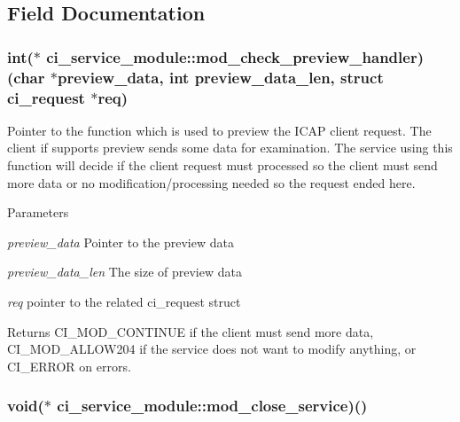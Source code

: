 \subsection{Field Documentation}
\hypertarget{structci__service__module_a2a50b9701b4d11e996167c7c992256da}{
\subsubsection[{mod\_\-check\_\-preview\_\-handler}]{\setlength{\rightskip}{0pt plus 5cm}int($\ast$ {\bf ci\_\-service\_\-module::mod\_\-check\_\-preview\_\-handler})(char $\ast$preview\_\-data, int preview\_\-data\_\-len, struct ci\_\-request $\ast$req)}}
\label{structci__service__module_a2a50b9701b4d11e996167c7c992256da}


Pointer to the function which is used to preview the ICAP client request. The client if supports preview sends some data for examination. The service using this function will decide if the client request must processed so the client must send more data or no modification/processing needed so the request ended here. 
\begin{DoxyParams}{Parameters}
\item[{\em preview\_\-data}]Pointer to the preview data \item[{\em preview\_\-data\_\-len}]The size of preview data \item[{\em req}]pointer to the related ci\_\-request struct \end{DoxyParams}
\begin{DoxyReturn}{Returns}
CI\_\-MOD\_\-CONTINUE if the client must send more data, CI\_\-MOD\_\-ALLOW204 if the service does not want to modify anything, or CI\_\-ERROR on errors. 
\end{DoxyReturn}
\hypertarget{structci__service__module_a6ecb3941f63aed5ae248db8a679d69ae}{
\subsubsection[{mod\_\-close\_\-service}]{\setlength{\rightskip}{0pt plus 5cm}void($\ast$ {\bf ci\_\-service\_\-module::mod\_\-close\_\-service})()}}
\label{structci__service__module_a6ecb3941f63aed5ae248db8a679d69ae}


